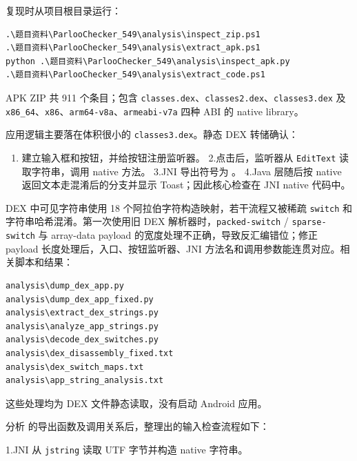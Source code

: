 复现时从项目根目录运行：

\begin{verbatim}
.\题目资料\ParlooChecker_549\analysis\inspect_zip.ps1
.\题目资料\ParlooChecker_549\analysis\extract_apk.ps1
python .\题目资料\ParlooChecker_549\analysis\inspect_apk.py
.\题目资料\ParlooChecker_549\analysis\extract_code.ps1
\end{verbatim}

APK ZIP 共 911 个条目；包含 \texttt{classes.dex}、\texttt{classes2.dex}、\texttt{classes3.dex} 及 \texttt{x86\_64}、\texttt{x86}、\texttt{arm64-v8a}、\texttt{armeabi-v7a} 四种 ABI 的 native library。

应用逻辑主要落在体积很小的 \texttt{classes3.dex}。静态 DEX 转储确认：

\begin{enumerate}
\def\labelenumi{\arabic{enumi}.}
\tightlist
\item
  \texttt{} 建立输入框和按钮，并给按钮注册监听器。 2.点击后，监听器从 \texttt{EditText} 读取字符串，调用 \texttt{} native 方法。 3.JNI 导出符号为 \texttt{}。 4.Java 层随后按 native 返回文本走混淆后的分支并显示 Toast；因此核心检查在 JNI native 代码中。
\end{enumerate}

DEX 中可见字符串使用 18 个阿拉伯字符构造映射，若干流程又被稀疏 \texttt{switch} 和字符串哈希混淆。第一次使用旧 DEX 解析器时，\texttt{packed-switch} / \texttt{sparse-switch} 与 array-data payload 的宽度处理不正确，导致反汇编错位；修正 payload 长度处理后，入口、按钮监听器、JNI 方法名和调用参数能连贯对应。相关脚本和结果：

\begin{verbatim}
analysis\dump_dex_app.py
analysis\dump_dex_app_fixed.py
analysis\extract_dex_strings.py
analysis\analyze_app_strings.py
analysis\decode_dex_switches.py
analysis\dex_disassembly_fixed.txt
analysis\dex_switch_maps.txt
analysis\app_string_analysis.txt
\end{verbatim}

这些处理均为 DEX 文件静态读取，没有启动 Android 应用。

分析 \texttt{} 的导出函数及调用关系后，整理出的输入检查流程如下：

1.JNI 从 \texttt{jstring} 读取 UTF 字节并构造 native 字符串。

